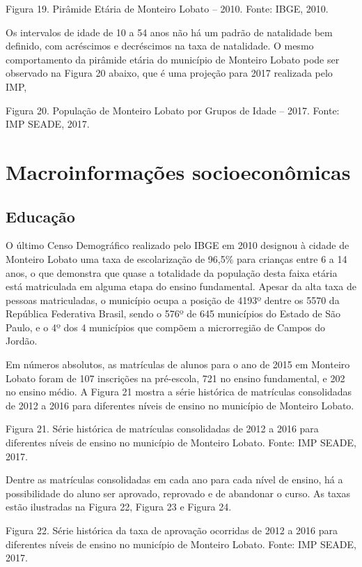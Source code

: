  
Figura 19.  Pirâmide Etária de Monteiro Lobato – 2010.
Fonte: IBGE, 2010.

Os intervalos de idade de 10 a 54 anos não há um padrão de natalidade bem definido, com acréscimos e decréscimos na taxa de natalidade. O mesmo comportamento da pirâmide etária do município de Monteiro Lobato pode ser observado na Figura 20 abaixo, que é uma projeção para 2017 realizada pelo IMP,  
 
Figura 20. População de Monteiro Lobato por Grupos de Idade – 2017.
Fonte: IMP SEADE, 2017.

\section{Macroinformações socioeconômicas}
\subsection{Educação}

O último Censo Demográfico realizado pelo IBGE em 2010 designou à cidade de Monteiro Lobato uma taxa de escolarização de 96,5\% para crianças entre 6 a 14 anos, o que demonstra que quase a totalidade da população desta faixa etária está matriculada em alguma etapa do ensino fundamental. Apesar da alta taxa de pessoas matriculadas, o município ocupa a posição de 4193º dentre os 5570 da República Federativa Brasil, sendo o 576º de 645 municípios do Estado de São Paulo, e o 4º dos 4 municípios que compõem a microrregião de Campos do Jordão.

Em números absolutos, as matrículas de alunos para o ano de 2015 em Monteiro Lobato foram de 107 inscrições na pré-escola, 721 no ensino fundamental, e 202 no ensino médio. A Figura 21 mostra a série histórica de matrículas consolidadas de 2012 a 2016 para diferentes níveis de ensino no município de Monteiro Lobato.

Figura 21. Série histórica de matrículas consolidadas de 2012 a 2016 para diferentes níveis de ensino no município de Monteiro Lobato.
Fonte: IMP SEADE, 2017.

Dentre as matrículas consolidadas em cada ano para cada nível de ensino, há a possibilidade do aluno ser aprovado, reprovado e de abandonar o curso. As taxas estão ilustradas na Figura 22, Figura 23 e Figura 24.

Figura 22. Série histórica da taxa de aprovação ocorridas de 2012 a 2016 para diferentes níveis de ensino no município de Monteiro Lobato.
Fonte: IMP SEADE, 2017.

